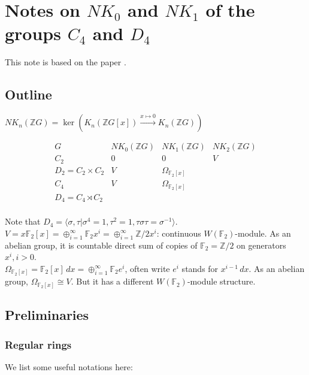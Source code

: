 \chapter{Notes on \texorpdfstring{$NK_0$}{NK0} and \texorpdfstring{$NK_1$}{NK1} of the groups \texorpdfstring{$C_4$}{C4} and \texorpdfstring{$D_4$}{D4}}
This note is based on the paper \cite{weibel2009nk0}.
\section{Outline}
\begin{definition}
$NK_n(\mathbb{Z}G)=\ker(K_n(\mathbb{Z}G[x])\overset{x\mapsto 0}\longrightarrow K_n(\mathbb{Z}G))$
\end{definition}
\begin{equation*}
	\begin{array}{c|c|c|c}
	G& NK_0(\mathbb{Z}G) & NK_1(\mathbb{Z}G) &NK_2(\mathbb{Z}G) \\
	\hline
	C_2 & 0 & 0&V \\
	\hline
	D_2=C_2\times C_2&V&\Omega_{\mathbb{F}_2[x]} & \\
	\hline
	C_4 & V&\Omega_{\mathbb{F}_2[x]} & \\
	\hline
	D_4=C_4\rtimes C_2& \\
	\end{array}
\end{equation*}

Note that $D_4=\langle \sigma, \tau|\sigma^4=1,\tau^2=1,\tau \sigma \tau=\sigma^{-1} \rangle$.\\
$V=x \mathbb{F}_2[x]=\oplus_{i=1}^\infty \mathbb{F}_2 x^i = \oplus_{i=1}^\infty \mathbb{Z}/2 x^i$: continuous $W(\mathbb{F}_2)$-module. As an abelian group, it is countable direct sum of copies of $\mathbb{F}_2=\mathbb{Z}/2$ on generators $x^i,i>0$.\\
$\Omega_{\mathbb{F}_2[x]}= \mathbb{F}_2[x]\,dx = \oplus_{i=1}^\infty \mathbb{F}_2 e^i $, often write $e^i$ stands for $x^{i-1}\, dx$. As an abelian group, $\Omega_{\mathbb{F}_2[x]}\cong V$. But it has a different $W(\mathbb{F}_2)$-module structure.

\section{Preliminaries}
\subsection{Regular rings} %
\label{sub:regular_rings}
We list some useful notations here:

